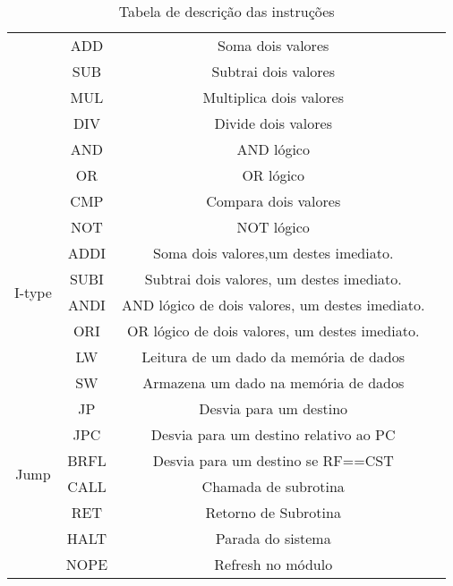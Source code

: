 \begin{table}[H]
\begin{center}
\begin{longtable}[pos]{| c | c | c | m{7cm} |}
          \hline
          \endlastfoot    
			\multirow{8}{*}{R-type} & ADD & Soma dois valores \\ \cline{2-3}	
	& SUB & Subtrai dois valores \\ \cline{2-3}	
	& MUL & Multiplica dois valores \\ \cline{2-3}	
	& DIV & Divide dois valores \\ \cline{2-3}
	& AND & AND lógico \\ \cline{2-3}
	& OR & OR lógico  \\ \cline{2-3}
	& CMP & Compara dois valores \\ \cline{2-3}
	& NOT & NOT lógico \\ \hline 
	\multirow{4}{*}{I-type} & ADDI & Soma dois valores,um destes imediato. \\ \cline{2-3}
	& SUBI & Subtrai dois valores, um destes imediato. \\ \cline{2-3}
	& ANDI & AND lógico de dois valores, um destes imediato. \\ \cline{2-3}
	& ORI & OR lógico de dois valores, um destes imediato. \\ \cline{2-3}
	& LW & Leitura de um dado da memória de dados \\ \cline{2-3}
	& SW & Armazena um dado na memória de dados \\ \hline
	\multirow{6}{*}{Jump} & JP & Desvia para um destino \\ \cline{2-3}
	& JPC & Desvia para um destino relativo ao PC \\ \cline{2-3}
	& BRFL & Desvia para um destino se RF==CST \\ \cline{2-3}
	& CALL & Chamada de subrotina \\ \cline{2-3}
	& RET & Retorno de Subrotina \\ \cline{2-3}
	& HALT & Parada do sistema \\ \cline{2-3}
	& NOPE & Refresh no módulo \\ \hline
\end{longtable}
\caption{Tabela de descrição das instruções}
\end{center}
\end{table}

